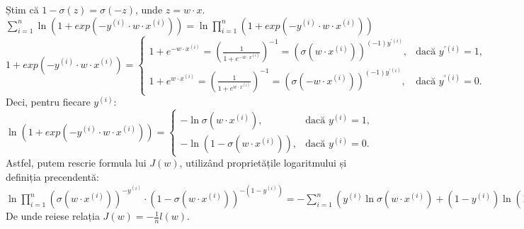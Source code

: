 \documentclass{article}
\begin{document}
Știm că \( 1 - \sigma (z) = \sigma (-z) \), unde \( z = w \cdot x \). \\

\( \sum_{i=1}^{n} \ln (1 + exp(-y^{(i)} \cdot w \cdot x^{(i)})) = \ln \prod_{i=1}^{n} (1 + exp(-y^{(i)} \cdot w \cdot x^{(i)})) \) \\

\( 1 + exp(-y^{(i)} \cdot w \cdot x^{(i)}) = \begin{cases}
1 + e^{-w \cdot x^{(i)}} = (\frac{1}{1 + e^{-w \cdot x^{(i)}}})^{-1} = (\sigma (w \cdot x^{(i)}))^{(-1)y^{'(i)}}, & \text{dacă } y^{'(i)} = 1, \\
1 + e^{w \cdot x^{(i)}} = (\frac{1}{1 + e^{w \cdot x^{(i)}}})^{-1} = (\sigma (-w \cdot x^{(i)}))^{(-1)y^{'(i)}}, & \text{dacă } y^{'(i)} = 0.
\end{cases} \) \\

Deci, pentru fiecare \( y^{(i)} \): \\

\( \ln (1 + exp(-y^{(i)} \cdot w \cdot x^{(i)})) = \begin{cases}
-\ln \sigma (w \cdot x^{(i)}), & \text{dacă } y^{(i)} = 1, \\
-\ln (1 - \sigma (w \cdot x^{(i)})), & \text{dacă } y^{(i)} = 0.
\end{cases} \) \\

Astfel, putem rescrie formula lui \( J(w) \), utilizând proprietățile logaritmului și definiția precendentă: \\

\( \ln \prod_{i=1}^{n} (\sigma (w \cdot x^{(i)}))^{-y^{(i)}} \cdot (1 - \sigma (w \cdot x^{(i)}))^{-(1-y^{(i)})} = -\sum_{i=1}^{n} (y^{(i)} \ln \sigma (w \cdot x^{(i)}) + (1 - y^{(i)}) \ln (1 - \sigma (w \cdot x^{(i)}))) \) \\

De unde reiese relația \( J(w) = -\frac{1}{n} l(w) \).
\end{document}
